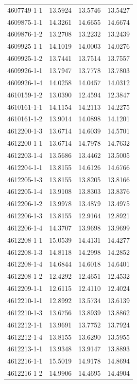 \begin{longtable}{lrrr}
4607749-1-1 & 13.5924 & 13.5746 & 13.5427 \\
4609875-1-1 & 14.3261 & 14.6655 & 14.6674 \\
4609876-1-2 & 13.2708 & 13.2232 & 13.2439 \\
4609925-1-1 & 14.1019 & 14.0003 & 14.0276 \\
4609925-1-2 & 13.7441 & 13.7514 & 13.7557 \\
4609926-1-1 & 13.7947 & 13.7778 & 13.7803 \\
4609926-1-4 & 14.0258 & 14.0457 & 14.0312 \\
4610159-1-2 & 13.0390 & 12.4594 & 12.3847 \\
4610161-1-1 & 14.1154 & 14.2113 & 14.2275 \\
4610161-1-2 & 13.9014 & 14.0898 & 14.1201 \\
4612200-1-3 & 13.6714 & 14.6039 & 14.5701 \\
4612200-1-1 & 13.6714 & 14.7978 & 14.7632 \\
4612203-1-4 & 13.5686 & 13.4462 & 13.5005 \\
4612204-1-1 & 13.8155 & 14.6126 & 14.6766 \\
4612205-1-3 & 13.8155 & 13.8205 & 13.8166 \\
4612205-1-4 & 13.9108 & 13.8303 & 13.8376 \\
4612206-1-2 & 13.9978 & 13.4879 & 13.4975 \\
4612206-1-3 & 13.8155 & 12.9164 & 12.8921 \\
4612206-1-4 & 14.3707 & 13.9698 & 13.9699 \\
4612208-1-1 & 15.0539 & 14.4131 & 14.4277 \\
4612208-1-3 & 14.8118 & 14.2998 & 14.2852 \\
4612208-1-4 & 14.6844 & 14.6018 & 14.6401 \\
4612208-1-2 & 12.4292 & 12.4651 & 12.4532 \\
4612209-1-1 & 12.6115 & 12.4110 & 12.4024 \\
4612210-1-1 & 12.8992 & 13.5734 & 13.6139 \\
4612210-1-3 & 13.6756 & 13.8939 & 13.8862 \\
4612212-1-1 & 13.9691 & 13.7752 & 13.7924 \\
4612212-1-4 & 13.8155 & 13.6290 & 13.5955 \\
4612213-1-1 & 13.9348 & 13.9147 & 13.8893 \\
4612216-1-1 & 15.5019 & 14.9178 & 14.8694 \\
4612216-1-2 & 14.9906 & 14.4695 & 14.4904 \\

\end{longtable}
